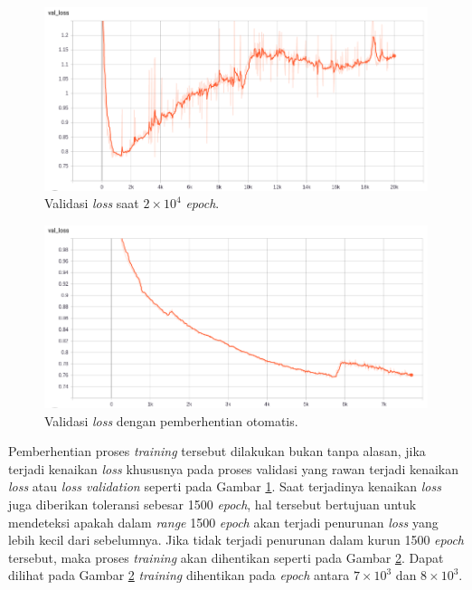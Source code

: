 \begin{figure} [!htb] \centering
	\includegraphics[scale=0.4]{img/hyperparam_val_loss_chap3.png}
	\caption{Validasi \textit{loss} saat $2 \times 10^{4}$ \textit{epoch}.}
	\label{fig:nn_dota2_val_loss_20k}
\end{figure}

\begin{figure} [!htb] \centering	
	\includegraphics[scale=0.4]{img/callback_val_loss_chap3.png}
	\caption{Validasi \textit{loss} dengan pemberhentian otomatis.}
	\label{fig:nn_dota2_val_loss_callback}
\end{figure}

Pemberhentian proses \textit{training} tersebut dilakukan bukan tanpa alasan, jika terjadi kenaikan \textit{loss} khususnya pada proses validasi yang rawan terjadi kenaikan \textit{loss} atau \textit{loss validation} seperti pada Gambar \ref{fig:nn_dota2_val_loss_20k}. Saat terjadinya kenaikan \textit{loss} juga diberikan toleransi sebesar 1500 \textit{epoch}, hal tersebut bertujuan untuk mendeteksi apakah dalam \textit{range} 1500 \textit{epoch} akan terjadi penurunan \textit{loss} yang lebih kecil dari sebelumnya. Jika tidak terjadi penurunan dalam kurun 1500 \textit{epoch} tersebut, maka proses \textit{training} akan dihentikan seperti pada Gambar \ref{fig:nn_dota2_val_loss_callback}. Dapat dilihat pada Gambar \ref{fig:nn_dota2_val_loss_callback} \textit{training} dihentikan pada \textit{epoch} antara $7 \times 10^{3}$ dan $8 \times 10^{3}$.
\vspace{1ex}

